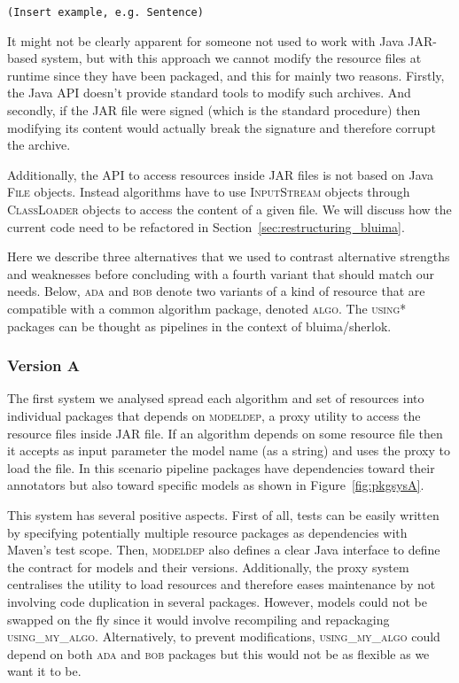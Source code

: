 \documentclass{article}
\newcommand{\ID}[1]{{\textsc{#1}}}
\newcommand{\JAR}{JAR\xspace}
\newcommand{\TODO}[1]{\texttt{\textcolor{YellowOrange}{(#1)}}} %
\begin{document}
\begin{appendices}
\TODO{Insert example, e.g. Sentence}

It might not be clearly apparent for someone not used to work with Java \JAR-based system, but with
this approach we cannot modify the resource files at runtime since they have been packaged, and this
for mainly two reasons. Firstly, the Java API doesn't provide standard tools to modify such
archives.  And secondly, if the \JAR file were signed (which is the standard procedure) then
modifying its content would actually break the signature and therefore corrupt the archive.

Additionally, the API to access resources inside \JAR files is not based on Java \ID{File} objects.
Instead algorithms have to use \ID{InputStream} objects through \ID{ClassLoader} objects to access
the content of a given file. We will discuss how the current code need to be refactored in
Section~\ref{sec:restructuring_bluima}.

Here we describe three alternatives that we used to contrast alternative strengths and weaknesses before concluding with a fourth variant that should match our needs. Below, \ID{ada} and \ID{bob} denote two variants of a kind of resource that are compatible with a common algorithm package, denoted \ID{algo}. The \ID{using*} packages can be thought as pipelines in the context of bluima/sherlok.

\subsubsection{Version A}

The first system we analysed spread each algorithm and set of resources into individual packages
that depends on \ID{modeldep}, a proxy utility to access the resource files inside \JAR file. If an
algorithm depends on some resource file then it accepts as input parameter the model name (as a
string) and uses the proxy to load the file. In this scenario pipeline packages have dependencies
toward their annotators but also toward specific models as shown in Figure~\ref{fig:pkgsysA}.

This system has several positive aspects. First of all, tests can be easily written by specifying potentially multiple resource packages as dependencies with Maven's test scope. Then, \ID{modeldep} also defines a clear Java interface to define the contract for models and their versions. Additionally, the proxy system centralises the utility to load resources and therefore eases maintenance by not involving code duplication in several packages. However, models could not be swapped on the fly since it would involve recompiling and repackaging \ID{using\_my\_algo}.  Alternatively, to prevent modifications, \ID{using\_my\_algo} could depend on both \ID{ada} and \ID{bob} packages but this would not be as flexible as we want it to be.


\end{appendices}
\end{document}
